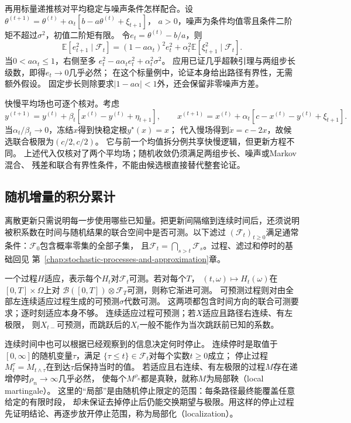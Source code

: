 再用标量递推核对平均稳定与噪声条件怎样配合。设
$\theta^{(t+1)}=\theta^{(t)}+\alpha_t[b-a\theta^{(t)}+\xi_{t+1}]$，
$a>0$，噪声为条件均值零且条件二阶矩不超过$\sigma^2$，初值二阶矩有限。
令$e_t=\theta^{(t)}-b/a$，则
\[
  \mathbb E[e_{t+1}^2\mid\mathcal F_t]
  =(1-a\alpha_t)^2e_t^2+
       \alpha_t^2\mathbb E[\xi_{t+1}^2\mid\mathcal F_t].
\]
当$0<a\alpha_t\leq1$，右侧至多
$e_t^2-a\alpha_te_t^2+\alpha_t^2\sigma^2$。
应用已证几乎超鞅引理与两组步长级数，即得$e_t\to0$几乎必然；
在这个标量例中，论证本身给出路径有界性，无需额外假设。
固定步长则除要求$|1-a\alpha|<1$外，还会保留非零噪声方差。

快慢平均场也可逐个核对。考虑
\[
  y^{(t+1)}=y^{(t)}+\beta_t[x^{(t)}-y^{(t)}+\eta_{t+1}],\qquad
  x^{(t+1)}=x^{(t)}+\alpha_t[c-x^{(t)}-y^{(t)}+\xi_{t+1}].
\]
当$\alpha_t/\beta_t\to0$，冻结$x$得到快稳定根$y^\star(x)=x$；
代入慢场得到$\dot x=c-2x$，故候选联合极限为$(c/2,c/2)$。
它与前一个均值拆分例共享快慢逻辑，但更新方程不同。
上述代入仅核对了两个平均场；随机收敛仍须满足两组步长、噪声或Markov混合、
残差和联合有界性条件，不能由候选根直接替代整套论证。

\subsection{随机增量的积分累计}

离散更新只需说明每一步使用哪些已知量。把更新间隔缩到连续时间后，还须说明
被积系数在时间与随机结果的联合空间中是否可测。以下滤过
$(\mathcal F_t)_{t\geq0}$满足通常条件：$\mathcal F_0$包含概率零集的全部子集，
且$\mathcal F_t=\bigcap_{s>t}\mathcal F_s$。过程、滤过和停时的基础回见
第~\ref{chap:stochastic-processes-and-approximation}章。

一个过程$H$适应，表示每个$H_t$对$\mathcal F_t$可测。若对每个$T$，
$(t,\omega)\mapsto H_t(\omega)$在$[0,T]\times\Omega$上对
$\mathcal B([0,T])\otimes\mathcal F_T$可测，则称它渐进可测。
可预测过程则对由全部左连续适应过程生成的可预测$\sigma$代数可测。
这两项都包含时间方向的联合可测要求；逐时刻适应本身不够。
连续适应过程可预测；若$X$适应且路径右连续、有左极限，
则$X_{t-}$可预测，而跳跃后的$X_t$一般不能作为当次跳跃前已知的系数。

连续时间中也可以根据已经观察到的信息决定何时停止。
连续停时是取值于$[0,\infty]$的随机变量$\tau$，满足
$\{\tau\leq t\}\in\mathcal F_t$对每个实数$t\geq0$成立；
停止过程$M^\tau_t=M_{t\wedge\tau}$在到达$\tau$后保持当时的值。
若适应且右连续、有左极限的过程$M$存在递增停时$\rho_n\to\infty$几乎必然，
使每个$M^{\rho_n}$都是真鞅，就称$M$为局部鞅（local martingale）。
这里的“局部”是由随机停止限定的范围：每条路径最终能覆盖任意给定的有限时段，
却未保证去掉停止后仍能交换期望与极限。用这样的停止过程先证明结论、再逐步放开停止范围，称为局部化（localization）。

